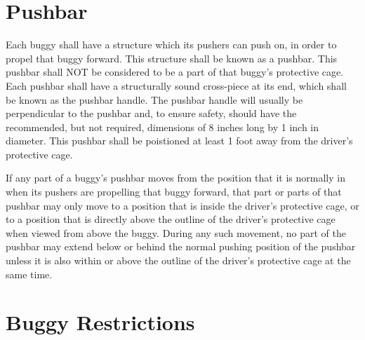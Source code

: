 \section{Pushbar}

	Each buggy shall have a structure which its pushers can push on, in order to propel that buggy forward. This structure shall be known as a pushbar. This pushbar shall NOT be considered to be a part of that buggy's protective cage. Each pushbar shall have a structurally sound cross-piece at its end, which shall be known as the pushbar handle. The pushbar handle will usually be perpendicular to the pushbar and, to ensure safety, should have the recommended, but not required, dimensions of 8 inches long by 1 inch in diameter. This pushbar shall be poistioned at least 1 foot away from the driver's protective cage.

	If any part of a buggy's pushbar moves from the position that it is normally in when its pushers are propelling that buggy forward, that part or parts of that pushbar may only move to a position that is inside the driver's protective cage, or to a position that is directly above the outline of the driver's protective cage when viewed from above the buggy. During any such movement, no part of the pushbar may extend below or behind the normal pushing position of the pushbar unless it is also within or above the outline of the driver's protective cage at the same time.

\section{Buggy Restrictions}

